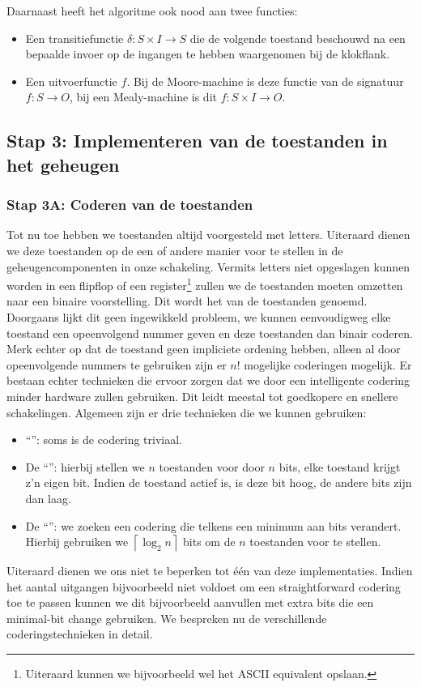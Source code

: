 Daarnaast heeft het algoritme ook nood aan twee functies:
\begin{itemize}
 \item Een transitiefunctie $\delta:S\times I\rightarrow S$ die de volgende toestand beschouwd na een bepaalde invoer op de ingangen te hebben waargenomen bij de klokflank.
 \item Een uitvoerfunctie $f$. Bij de Moore-machine is deze functie van de signatuur $f:S\rightarrow O$, bij een Mealy-machine is dit $f:S\times I\rightarrow O$.
\end{itemize}

\subsection{Stap 3: Implementeren van de toestanden in het geheugen}
\subsubsection{Stap 3A: Coderen van de toestanden}
\label{term:minimalBitChange}
\label{term:grayCodeCounter}
Tot nu toe hebben we toestanden altijd voorgesteld met letters. Uiteraard dienen we deze toestanden op de een of andere manier voor te stellen in de geheugencomponenten in onze schakeling. Vermits letters niet opgeslagen kunnen worden in een flipflop of een register\footnote{Uiteraard kunnen we bijvoorbeeld wel het ASCII equivalent opslaan.} zullen we de toestanden moeten omzetten naar een binaire voorstelling. Dit wordt het  van de toestanden genoemd. Doorgaans lijkt dit geen ingewikkeld probleem, we kunnen eenvoudigweg elke toestand een opeenvolgend nummer geven en deze toestanden dan binair coderen. Merk echter op dat de toestand geen impliciete ordening hebben, alleen al door opeenvolgende nummers te gebruiken zijn er $n!$ mogelijke coderingen mogelijk. Er bestaan echter technieken die ervoor zorgen dat we door een intelligente codering minder hardware zullen gebruiken. Dit leidt meestal tot goedkopere en snellere schakelingen. Algemeen zijn er drie technieken die we kunnen gebruiken:
\begin{itemize}
 \item ``'': soms is de codering triviaal.
 \item De ``'': hierbij stellen we $n$ toestanden voor door $n$ bits, elke toestand krijgt z'n eigen bit. Indien de toestand actief is, is deze bit hoog, de andere bits zijn dan laag.
 \item De ``'': we zoeken een codering die telkens een minimum aan bits verandert. Hierbij gebruiken we $\left\lceil\log_2 n\right\rceil$ bits om de $n$ toestanden voor te stellen.
\end{itemize}
Uiteraard dienen we ons niet te beperken tot \'e\'en van deze implementaties. Indien het aantal uitgangen bijvoorbeeld niet voldoet om een straightforward codering toe te passen kunnen we dit bijvoorbeeld aanvullen met extra bits die een minimal-bit change gebruiken. We bespreken nu de verschillende coderingstechnieken in detail.
